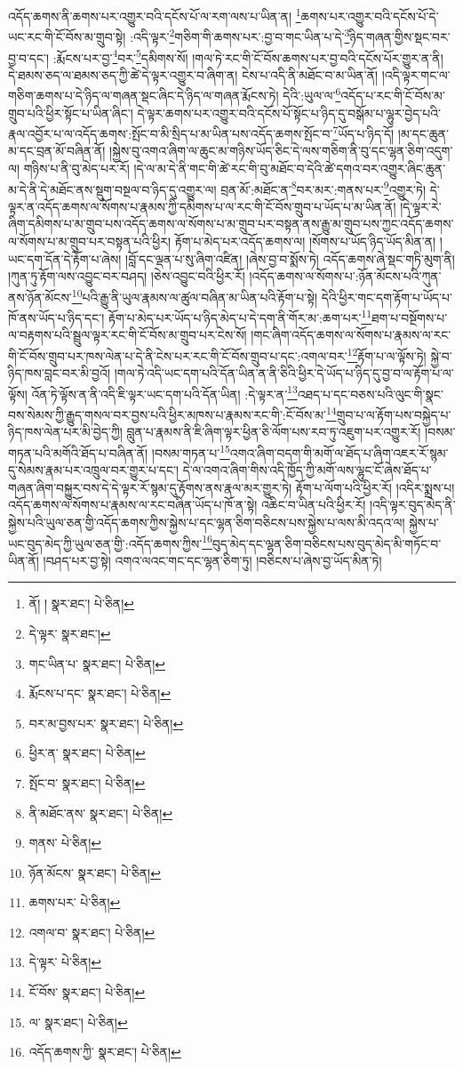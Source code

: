འདོད་ཆགས་ནི་ཆགས་པར་འགྱུར་བའི་དངོས་པོ་ལ་རག་ལས་པ་ཡིན་ན། \footnote{ནོ། །   སྣར་ཐང་།  པེ་ཅིན། }ཆགས་པར་འགྱུར་བའི་དངོས་པོ་དེ་ཡང་རང་གི་ངོ་བོས་མ་གྲུབ་སྟེ། :འདི་ལྟར་\footnote{དེ་ལྟར་  སྣར་ཐང་། }གཅིག་གི་ཆགས་པར་:བྱ་བ་གང་ཡིན་པ་དེ་\footnote{གང་ཡིན་པ་  སྣར་ཐང་།  པེ་ཅིན། }ཉིད་གཞན་གྱིས་སྡང་བར་བྱ་བ་དང་། :རྨོངས་པར་བྱ་\footnote{རྨོངས་པ་དང་  སྣར་ཐང་།  པེ་ཅིན། }བར་\footnote{བར་མ་བྱས་པར་  སྣར་ཐང་།  པེ་ཅིན། }དམིགས་སོ། །གལ་ཏེ་རང་གི་ངོ་བོས་ཆགས་པར་བྱ་བའི་དངོས་པོར་གྱུར་ན་ནི། དེ་ཐམས་ཅད་ལ་ཐམས་ཅད་ཀྱི་ཚེ་དེ་ལྟར་འགྱུར་བ་ཞིག་ན། ངེས་པ་འདི་ནི་མཐོང་བ་མ་ཡིན་ནོ། །འདི་ལྟར་གང་ལ་གཅིག་ཆགས་པ་དེ་ཉིད་ལ་གཞན་སྡང་ཞིང་དེ་ཉིད་ལ་གཞན་རྨོངས་ཏེ། དེའི་:ཡུལ་ལ་\footnote{ཕྱིར་ན་  སྣར་ཐང་།  པེ་ཅིན། }འདོད་པ་རང་གི་ངོ་བོས་མ་གྲུབ་པའི་ཕྱིར་སྟོང་པ་ཡིན་ཞིང་། དེ་ལྟར་ཆགས་པར་འགྱུར་བའི་དངོས་པོ་སྟོང་པ་ཉིད་དུ་བསྒོམ་པ་ལྷུར་བྱེད་པའི་རྣལ་འབྱོར་པ་ལ་འདོད་ཆགས་:སྤོང་བ་མི་སྲིད་པ་མ་ཡིན་པས་འདོད་ཆགས་སྤོང་བ་\footnote{སྤོང་བ་  སྣར་ཐང་།  པེ་ཅིན། }ཡོད་པ་ཉིད་དོ། །མ་དང་ཆུན་མ་དང་བྲན་མོ་བཞིན་ནོ། །སྐྱེས་བུ་འགའ་ཞིག་ལ་ཆུང་མ་གཉིས་ཡོད་ཅིང་དེ་ལས་གཅིག་ནི་བུ་དང་ལྷན་ཅིག་འདུག་ལ། གཉིས་པ་ནི་བུ་མེད་པར་རོ། །དེ་ལ་མ་དེ་ནི་གང་གི་ཚེ་རང་གི་བུ་མཐོང་བ་དེའི་ཚེ་དགའ་བར་འགྱུར་ཞིང་ཆུན་མ་དེ་ནི་དེ་མཐོང་ནས་སྡུག་བསྔལ་བ་ཉིད་དུ་འགྱུར་ལ། བྲན་མོ་:མཐོང་ན་\footnote{ནི་མཐོང་ནས་  སྣར་ཐང་།  པེ་ཅིན། }བར་མར་:གནས་པར་\footnote{གནས་  པེ་ཅིན། }འགྱུར་ཏེ། དེ་ལྟར་ན་འདོད་ཆགས་ལ་སོགས་པ་རྣམས་ཀྱི་དམིགས་པ་ལ་རང་གི་ངོ་བོས་གྲུབ་པ་ཡོད་པ་མ་ཡིན་ནོ། །དེ་ལྟར་རེ་ཞིག་དམིགས་པ་མ་གྲུབ་པས་འདོད་ཆགས་ལ་སོགས་པ་མ་གྲུབ་པར་བསྟན་ནས་རྒྱུ་མ་གྲུབ་པས་ཀྱང་འདོད་ཆགས་ལ་སོགས་པ་མ་གྲུབ་པར་བསྟན་པའི་ཕྱིར། རྟོག་པ་མེད་པར་འདོད་ཆགས་ལ། །སོགས་པ་ཡོད་ཉིད་ཡོད་མིན་ན། །ཡང་དག་དོན་དེ་རྟོག་པ་ཞེས། །བློ་དང་ལྡན་པ་སུ་ཞིག་འཛིན། །ཞེས་བྱ་བ་སྨོས་ཏེ། འདོད་ཆགས་ཞེ་སྡང་གཏི་མུག་ནི། །ཀུན་ཏུ་རྟོག་ལས་འབྱུང་བར་བཤད། །ཅེས་འབྱུང་བའི་ཕྱིར་རོ། །འདོད་ཆགས་ལ་སོགས་པ་:ཉོན་མོངས་པའི་ཀུན་ནས་ཉོན་མོངས་\footnote{ཉོན་མོངས་  སྣར་ཐང་།  པེ་ཅིན། }པའི་རྒྱུ་ནི་ཡུལ་རྣམས་ལ་ཚུལ་བཞིན་མ་ཡིན་པའི་རྟོག་པ་སྟེ། དེའི་ཕྱིར་གང་དག་རྟོག་པ་ཡོད་པ་ཁོ་ནས་ཡོད་པ་ཉིད་དང་། རྟོག་པ་མེད་པར་ཡོད་པ་ཉིད་མེད་པ་དེ་དག་ནི་གོར་མ་:ཆག་པར་\footnote{ཆགས་པར་  པེ་ཅིན། }ཐག་པ་བསྔོགས་པ་ལ་བརྟགས་པའི་སྦྲུལ་ལྟར་རང་གི་ངོ་བོས་མ་གྲུབ་པར་ངེས་སོ། །གང་ཞིག་འདོད་ཆགས་ལ་སོགས་པ་རྣམས་ལ་རང་གི་ངོ་བོས་གྲུབ་པར་ཁས་ལེན་པ་དེ་ནི་ངེས་པར་རང་གི་ངོ་བོས་གྲུབ་པ་དང་:འགལ་བར་\footnote{འགལ་བ་  སྣར་ཐང་།  པེ་ཅིན། }རྟོག་པ་ལ་ལྟོས་ཏེ། སྐྱེ་བ་ཉིད་ཁས་བླང་བར་མི་བྱའོ། །གལ་ཏེ་འདི་ཡང་དག་པའི་དོན་ཡིན་ན་ནི་ཅིའི་ཕྱིར་དེ་ཡོད་པ་ཉིད་དུ་བྱ་བ་ལ་རྟོག་པ་ལ་ལྟོས། འོན་ཏེ་ལྟོས་ན་ནི་འདི་ཇི་ལྟར་ཡང་དག་པའི་དོན་ཡིན། :དེ་ལྟར་ན་\footnote{དེ་ལྟར་  པེ་ཅིན། }འཐད་པ་དང་བཅས་པའི་ལུང་གི་སྣང་བས་སེམས་ཀྱི་རྒྱུད་གསལ་བར་བྱས་པའི་ཕྱིར་མཁས་པ་རྣམས་རང་གི་:ངོ་བོས་མ་\footnote{ངོ་བོས་  སྣར་ཐང་།  པེ་ཅིན། }གྲུབ་པ་ལ་རྟོག་པས་བསྐྱེད་པ་ཉིད་ཁས་ལེན་པར་མི་བྱེད་ཀྱི། བླུན་པ་རྣམས་ནི་ཇི་ཞིག་ལྟར་ཕྱིན་ཅི་ལོག་པས་རབ་ཏུ་འཇུག་པར་འགྱུར་རོ། །བསམ་གཏན་པའི་མགོའི་ཐོད་པ་བཞིན་ནོ། །བསམ་གཏན་པ་\footnote{ལ་  སྣར་ཐང་།  པེ་ཅིན། }འགའ་ཞིག་བདག་གི་མགོ་ལ་ཐོད་པ་ཞིག་འཇར་རོ་སྙམ་དུ་སེམས་རྣམ་པར་འཁྲུལ་བར་གྱུར་པ་དང་། དེ་ལ་འགའ་ཞིག་གིས་འདི་ཁྱོད་ཀྱི་མགོ་ལས་ལྷུང་ངོ་ཞེས་ཐོད་པ་གཞན་ཞིག་བསྐྱུར་བས་དེ་དེ་ལྟར་རོ་སྙམ་དུ་རྟོགས་ནས་རྣལ་མར་གྱུར་ཏེ། རྟོག་པ་ལོག་པའི་ཕྱིར་རོ། །འདིར་སྨྲས་པ། འདོད་ཆགས་ལ་སོགས་པ་རྣམས་ལ་རང་བཞིན་ཡོད་པ་ཁོ་ན་སྟེ། འཆིང་བ་ཡིན་པའི་ཕྱིར་རོ། །འདི་ལྟར་བུད་མེད་ནི་སྐྱེས་པའི་ཡུལ་ཅན་གྱི་འདོད་ཆགས་ཀྱིས་སྐྱེས་པ་དང་ལྷན་ཅིག་བཅིངས་པས་སྐྱེས་པ་ལས་མི་འདའ་ལ། སྐྱེས་པ་ཡང་བུད་མེད་ཀྱི་ཡུལ་ཅན་གྱི་:འདོད་ཆགས་ཀྱིས་\footnote{འདོད་ཆགས་ཀྱི་  སྣར་ཐང་།  པེ་ཅིན། }བུད་མེད་དང་ལྷན་ཅིག་བཅིངས་པས་བུད་མེད་མི་གཏོང་བ་ཡིན་ནོ། །བཤད་པར་བྱ་སྟེ། འགའ་ལའང་གང་དང་ལྷན་ཅིག་ཏུ། །བཅིངས་པ་ཞེས་བྱ་ཡོད་མིན་ཏེ། 